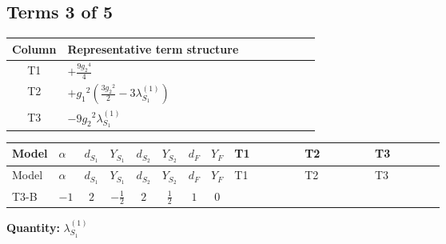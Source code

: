 \documentclass[8pt]{article}
\begin{document}
\begin{landscape}
\subsection*{Terms 3 of 5}
\begin{center}
\begin{tabular}{@{}c >{\raggedright\arraybackslash}p{0.82\linewidth}@{}}
\toprule
Column & Representative term structure \\
\midrule
T1 & \(\displaystyle +\frac{9 {g_2}^4}{4}\) \\
\midrule
T2 & \(\displaystyle +{g_1}^2 \left(\frac{3 {g_2}^2}{2}-3 {\lambda_{S_1}^{(1)}}\right)\) \\
\midrule
T3 & \(\displaystyle -9 {g_2}^2 {\lambda_{S_1}^{(1)}}\) \\
\midrule
\bottomrule
\end{tabular}
\end{center}
\smallskip
\tiny
\begin{longtable}{@{}llcccccc >{\raggedright\arraybackslash}p{0.21\linewidth} >{\raggedright\arraybackslash}p{0.21\linewidth} >{\raggedright\arraybackslash}p{0.21\linewidth}@{}}
\toprule
Model & $\alpha$ & $d_{S_1}$ & $Y_{S_1}$ & $d_{S_2}$ & $Y_{S_2}$ & $d_F$ & $Y_F$ & T1 & T2 & T3 \\
\midrule
\endfirsthead
\toprule
Model & $\alpha$ & $d_{S_1}$ & $Y_{S_1}$ & $d_{S_2}$ & $Y_{S_2}$ & $d_F$ & $Y_F$ & T1 & T2 & T3 \\
\midrule
\endhead
T3-B & $-1$ & $2$ & $-\frac{1}{2}$ & $2$ & $\frac{1}{2}$ & $1$ & $0$ & \scriptsize\adjustbox{max width=\linewidth}{$\begin{gathered} +\frac{9 {g_2}^4}{4}\end{gathered}$} & \scriptsize\adjustbox{max width=\linewidth}{$\begin{gathered} +{g_1}^2 \left(\frac{3 {g_2}^2}{2}-3 {\lambda_{S_1}^{(1)}}\right)\end{gathered}$} & \scriptsize\adjustbox{max width=\linewidth}{$\begin{gathered} -9 {g_2}^2 {\lambda_{S_1}^{(1)}}\end{gathered}$} \\
\midrule
\bottomrule
\end{longtable}
\clearpage
\noindent\textbf{Quantity: }$\lambda_{S_1}^{(1)}$\par\smallskip

\end{landscape}
\end{document}
